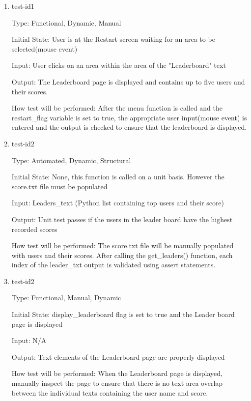 \documentclass[12pt, titlepage]{article}
\begin{document}
\begin{enumerate}

\item{test-id1\\}

Type: Functional, Dynamic, Manual
					
Initial State: User is at the Restart screen waiting for an area to be selected(mouse event)
					
Input: User clicks on an area within the area of the "Leaderboard" text
					
Output: The Leaderboard page is displayed and contains up to five users and their scores.
					
How test will be performed: After the menu function is called and the restart\_flag variable is set to true, the appropriate user input(mouse event) is entered and the output is checked to ensure that the leaderboard is displayed. 

\item{test-id2\\}

Type: Automated, Dynamic, Structural
					
Initial State: None, this function is called on a unit basis. However the score.txt file must be populated
					
Input: Leaders\_text (Python list containing top users and their score)
					
Output: Unit test passes if the users in the leader board have the highest recorded scores
					
How test will be performed: The score.txt file will be manually populated with users and their scores.
After calling the get\_leaders() function, each index of the leader\_txt output is validated using assert statements.

\item{test-id2\\}

Type: Functional, Manual, Dynamic 
					
Initial State: display\_leaderboard flag is set to true and the Leader board page is displayed
					
Input: N/A
					
Output: Text elements of the Leaderboard page are properly displayed
					
How test will be performed: When the Leaderboard page is displayed, manually inspect the page to 
ensure that there is no text area overlap between the individual texts containing the user name and score. 

\end{enumerate}
\end{document}
